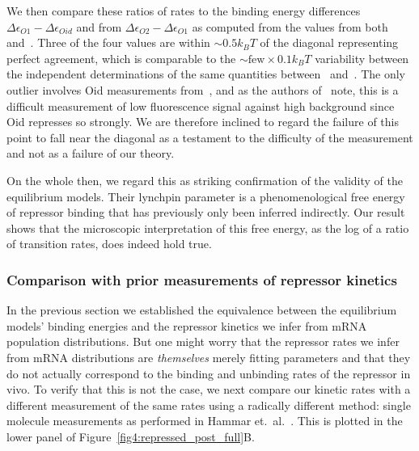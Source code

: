 We then compare these ratios of rates to the binding energy differences
$\Delta\epsilon_{O1} - \Delta\epsilon_{Oid}$ and from
$\Delta\epsilon_{O2} - \Delta\epsilon_{O1}$ as computed from the values
from both~\cite{Garcia2011a} and~\cite{Razo-Mejia2018}.
Three of the four values are within $\sim0.5 k_BT$ of the diagonal
representing perfect agreement, which is comparable to the
$\sim\text{few}\times0.1 k_BT$ variability between the independent
determinations of the same quantities between~\cite{Garcia2011a}
and~\cite{Razo-Mejia2018}. The only outlier involves Oid measurements
from~\cite{Razo-Mejia2018}, and as the authors of~\cite{Razo-Mejia2018} note,
this is a difficult measurement of low fluorescence signal against
high background since Oid represses so strongly. We are therefore
inclined to regard the failure of this point to fall near the
diagonal as a testament to the difficulty of the measurement and
not as a failure of our theory.

On the whole then, we regard this as striking confirmation of the
validity of the equilibrium models. Their lynchpin parameter is a
phenomenological free energy of repressor binding that has
previously only been inferred indirectly. Our result shows that
the microscopic interpretation of this free energy, as the log of
a ratio of transition rates, does indeed hold true.

\subsubsection{Comparison with prior measurements of repressor kinetics}
In the previous section we established the equivalence between
the equilibrium models' binding energies and the repressor
kinetics we infer from mRNA population distributions.
But one might worry that the repressor rates we infer
from mRNA distributions are \textit{themselves} merely
fitting parameters and that they do not actually correspond to the
binding and unbinding rates of the repressor in vivo.
To verify that this is not the case, we next compare our kinetic rates with a
different measurement of the same rates using a radically different method:
single molecule measurements as performed in Hammar et.\ al.~\cite{Hammar2014}.
This is plotted in the lower panel of Figure~\ref{fig4:repressed_post_full}B.

